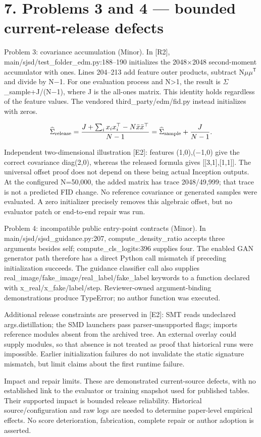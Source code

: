 \documentclass[10pt]{article}
\begin{document}
\section*{7. Problems 3 and 4 — bounded current-release defects}
Problem 3: covariance accumulation (Minor). In [R2], main/sjsd/test\_folder\_edm.py:188–190 initializes the 2048\(\times\)2048 second-moment accumulator with ones. Lines 204–213 add feature outer products, subtract N\(\mu\)\(\mu\)\(^{\mathsf T}\) and divide by N\(-\)1. For one evaluation process and N>1, the result is \(\Sigma\)\_sample+J/(N\(-\)1), where J is the all-ones matrix. This identity holds regardless of the feature values. The vendored third\_party/edm/fid.py instead initializes with zeros.\par
\[\widehat\Sigma_{\rm release}=
\frac{J+\sum_i x_ix_i^\top-N\bar x\bar x^\top}{N-1}
=\widehat\Sigma_{\rm sample}+\frac{J}{N-1}.\]\par
Independent two-dimensional illustration [E2]: features (1,0),(\(-\)1,0) give the correct covariance diag(2,0), whereas the released formula gives [[3,1],[1,1]]. The universal offset proof does not depend on these being actual Inception outputs. At the configured N=50,000, the added matrix has trace 2048/49,999; that trace is not a predicted FID change. No reference covariance or generated samples were evaluated. A zero initializer precisely removes this algebraic offset, but no evaluator patch or end-to-end repair was run.\par
Problem 4: incompatible public entry-point contracts (Minor). In main/sjsd/sjsd\_guidance.py:207, compute\_density\_ratio accepts three arguments besides self; compute\_cls\_logits:396 supplies four. The enabled GAN generator path therefore has a direct Python call mismatch if preceding initialization succeeds. The guidance classifier call also supplies real\_image/fake\_image/real\_label/fake\_label keywords to a function declared with x\_real/x\_fake/label/step. Reviewer-owned argument-binding demonstrations produce TypeError; no author function was executed.\par
Additional release constraints are preserved in [E2]: SMT reads undeclared args.distillation; the SMD launchers pass parser-unsupported flags; imports reference modules absent from the archived tree. An external overlay could supply modules, so that absence is not treated as proof that historical runs were impossible. Earlier initialization failures do not invalidate the static signature mismatch, but limit claims about the first runtime failure.\par
Impact and repair limits. These are demonstrated current-source defects, with no established link to the evaluator or training snapshot used for published tables. Their supported impact is bounded release reliability. Historical source/configuration and raw logs are needed to determine paper-level empirical effects. No score deterioration, fabrication, complete repair or author adoption is asserted.\par
\end{document}
